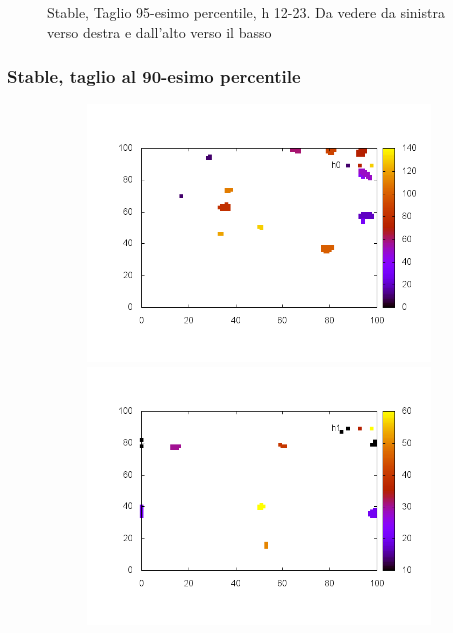 \documentclass[10pt,a4paper]{article}
\begin{document}
\begin{figure}
\begin{subfigure}[b]{1\textwidth}
\end{subfigure}
\caption{Stable, Taglio 95-esimo percentile, h 12-23. Da vedere da sinistra verso destra e dall'alto verso il basso}
\end{figure}

\subsubsection{Stable, taglio al 90-esimo percentile}

\begin{figure}
\centering
\begin{subfigure}[b]{1\textwidth}
\includegraphics[scale=.3]{./img/SCC_Stable3/cut90p/0.png}
\includegraphics[scale=.3]{./img/SCC_Stable3/cut90p/1.png}

\end{subfigure}
\end{figure}
\end{document}
